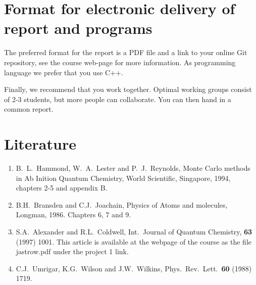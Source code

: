 \section*{Format for electronic delivery of report and programs}
The preferred format for the report is a PDF file and a link to your online Git repository, see the course web-page for more information. As programming language we prefer that you use C++. 

Finally, we recommend that you work together. Optimal working groups consist of 
2-3 students, but more people can collaborate. You can then hand in a common report. 

\section*{Literature}
\begin{enumerate}
\item B.~L.~Hammond, W.~A.~Lester and P.~J.~Reynolds, Monte Carlo methods
in Ab Inition Quantum Chemistry, World Scientific, Singapore, 1994, chapters
2-5 and appendix B.

\item B.H.~Bransden and C.J.~Joachain, Physics of Atoms and molecules,
Longman, 1986. Chapters 6, 7 and 9.
\item S.A.~Alexander and R.L.~Coldwell,
Int.~Journal of Quantum Chemistry, {\bf 63} (1997) 1001.  This article is available 
at the webpage of the course as the file jastrow.pdf under the project 1 link.
\item C.J.~Umrigar, K.G.~Wilson and J.W.~Wilkins, Phys.~Rev.~Lett.~{\bf 60}
(1988) 1719. 

\end{enumerate}
